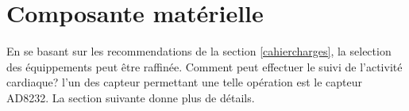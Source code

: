 \section{Composante matérielle\label{hardware}}
En se basant sur les recommendations de la section \ref{cahiercharges}, la selection des équippements peut être raffinée. Comment peut effectuer le suivi de l'activité cardiaque? l'un des capteur permettant une telle opération est le capteur AD8232. La section suivante donne plus de détails.


